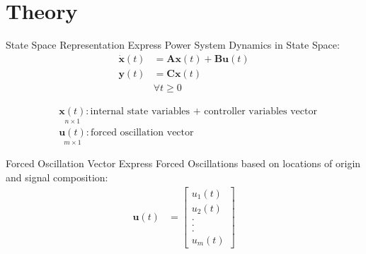 \section[Theory]{Theory}
\label{sec:lasso_theory}

\begin{frame}[fragile]{State Space Representation}
	Express Power System Dynamics in State Space:
	\begin{equation}
		\label{eq:ssr}
		\begin{align*}
			\dot{\textbf{x}}(t) &= 
			\textbf{A}\textbf{x}(t)
			+ \textbf{B}\textbf{u}(t)\\
			\textbf{y}(t) &= 
			\textbf{C}\textbf{x}(t)\\  
			& \forall t\geq0	
		\end{align*}
	\end{equation}
	
	\begin{align*}
		& \underset{\scriptscriptstyle n\times 1}{\textbf{x}(t)} : \text{internal state variables + controller variables vector}                                                                      \\
		& \underset{\scriptscriptstyle m\times 1}{\textbf{u}(t)} : \text{forced oscillation vector}
	\end{align*}
\end{frame}

\begin{frame}[fragile]{Forced Oscillation Vector}
	Express Forced Oscillations based on locations of origin and signal composition:
		\begin{align*}
			\textbf{u}(t) &= 
			\begin{bmatrix}
				u_1(t) \\
				u_2(t) \\
				. \\
				. \\
				. \\
				u_m(t)
			\end{bmatrix}		
		\end{align*}
	
\end{frame}